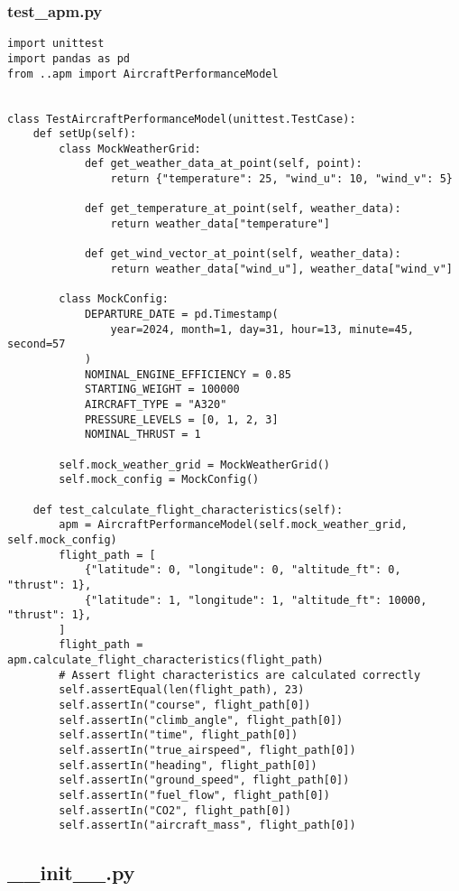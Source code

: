 \subsubsection{test_apm.py}
\begin{verbatim}
import unittest
import pandas as pd
from ..apm import AircraftPerformanceModel


class TestAircraftPerformanceModel(unittest.TestCase):
    def setUp(self):
        class MockWeatherGrid:
            def get_weather_data_at_point(self, point):
                return {"temperature": 25, "wind_u": 10, "wind_v": 5}

            def get_temperature_at_point(self, weather_data):
                return weather_data["temperature"]

            def get_wind_vector_at_point(self, weather_data):
                return weather_data["wind_u"], weather_data["wind_v"]

        class MockConfig:
            DEPARTURE_DATE = pd.Timestamp(
                year=2024, month=1, day=31, hour=13, minute=45, second=57
            )
            NOMINAL_ENGINE_EFFICIENCY = 0.85
            STARTING_WEIGHT = 100000
            AIRCRAFT_TYPE = "A320"
            PRESSURE_LEVELS = [0, 1, 2, 3]
            NOMINAL_THRUST = 1

        self.mock_weather_grid = MockWeatherGrid()
        self.mock_config = MockConfig()

    def test_calculate_flight_characteristics(self):
        apm = AircraftPerformanceModel(self.mock_weather_grid, self.mock_config)
        flight_path = [
            {"latitude": 0, "longitude": 0, "altitude_ft": 0, "thrust": 1},
            {"latitude": 1, "longitude": 1, "altitude_ft": 10000, "thrust": 1},
        ]
        flight_path = apm.calculate_flight_characteristics(flight_path)
        # Assert flight characteristics are calculated correctly
        self.assertEqual(len(flight_path), 23)
        self.assertIn("course", flight_path[0])
        self.assertIn("climb_angle", flight_path[0])
        self.assertIn("time", flight_path[0])
        self.assertIn("true_airspeed", flight_path[0])
        self.assertIn("heading", flight_path[0])
        self.assertIn("ground_speed", flight_path[0])
        self.assertIn("fuel_flow", flight_path[0])
        self.assertIn("CO2", flight_path[0])
        self.assertIn("aircraft_mass", flight_path[0])

\end{verbatim}
\subsection{__init__.py}
\begin{verbatim}

\end{verbatim}

